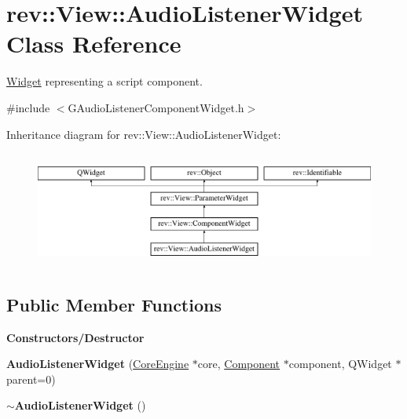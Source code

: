 \hypertarget{classrev_1_1_view_1_1_audio_listener_widget}{}\section{rev\+::View\+::Audio\+Listener\+Widget Class Reference}
\label{classrev_1_1_view_1_1_audio_listener_widget}


\mbox{\hyperlink{class_widget}{Widget}} representing a script component.  




{\ttfamily \#include $<$G\+Audio\+Listener\+Component\+Widget.\+h$>$}

Inheritance diagram for rev\+::View\+::Audio\+Listener\+Widget\+:\begin{figure}[H]
\begin{center}
\leavevmode
\includegraphics[height=3.829060cm]{classrev_1_1_view_1_1_audio_listener_widget}
\end{center}
\end{figure}
\subsection*{Public Member Functions}
\begin{Indent}\textbf{ Constructors/\+Destructor}\par
\begin{DoxyCompactItemize}
\item 
\mbox{\label{classrev_1_1_view_1_1_audio_listener_widget_af9cde0519292382c7eceea353feab92c}} 
{\bfseries Audio\+Listener\+Widget} (\mbox{\hyperlink{classrev_1_1_core_engine}{Core\+Engine}} $\ast$core, \mbox{\hyperlink{classrev_1_1_component}{Component}} $\ast$component, Q\+Widget $\ast$parent=0)
\item 
\mbox{\label{classrev_1_1_view_1_1_audio_listener_widget_a989f8f9c9733c06fc9a7b9d93cb7354b}} 
{\bfseries $\sim$\+Audio\+Listener\+Widget} ()
\end{DoxyCompactItemize}
\end{Indent}
